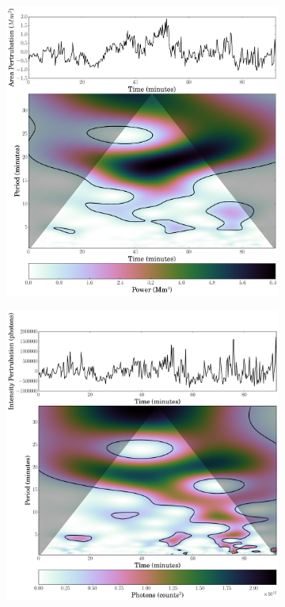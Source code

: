     \begin{figure}
        \centering
        \begin{subfigure}[b]{0.45\textwidth}
            \includegraphics[width=\textwidth]{dot_area.pdf}
        \end{subfigure}
        \begin{subfigure}[b]{0.45\textwidth}
            \includegraphics[width=\textwidth]{dot_inten.pdf}

\end{subfigure}
\end{figure}

